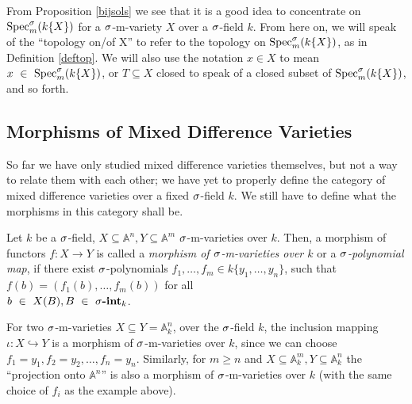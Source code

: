 From Proposition \ref{bijsols} we see that it is a good idea to concentrate on $\operatorname{Spec}^\sigma_m(k\{X\})$ for a $\sigma$-m-variety $X$ over a $\sigma$-field $k$.
 From here on, we will speak of the ``topology on/of X'' to refer to the topology on $\operatorname{Spec}^\sigma_m(k\{X\})$, as in Definition \ref{deftop}. 
We will also use the notation $x \in X$ to mean \\ $x~\in~\operatorname{Spec}^\sigma_m(k\{X\})$, or $T \subseteq X$ closed to speak of a closed subset of $\operatorname{Spec}^\sigma_m(k\{X\})$, and so forth.

\subsection{Morphisms of Mixed Difference Varieties}

So far we have only studied mixed difference varieties themselves, but not a way to relate them with each other; we have yet to properly define the category of mixed difference varieties over a fixed $\sigma$-field $k$. 
We still have to define what the morphisms in this category shall be.

\begin{defn}\label{spolynomialmaps}
Let $k$ be a $\sigma$-field, $X \subseteq \mathbb{A}^n,Y \subseteq \mathbb{A}^m$ $\sigma$-m-varieties over $k$. Then, a morphism of functors $f: X \rightarrow Y$ is called a \emph{morphism of $\sigma$-m-varieties over $k$} or a \emph{$\sigma$-polynomial map},
if there exist $\sigma$-polynomials $f_1,\ldots,f_m \in k\{y_1,\ldots,y_n\}$, such that $f(b) = (f_1(b),\ldots,f_m(b))$ for all \\ $b~\in~X(B), B~\in~\sigma\text{{\normalfont\textbf{-int}}}_k$.  
 
\end{defn}

\begin{ex}
For two $\sigma$-m-varieties $X \subseteq Y = \mathbb{A}^n_k$, over the $\sigma$-field $k$, the inclusion mapping $\iota: X \hookrightarrow Y$ is a morphism of $\sigma$-m-varieties over $k$, since we can choose $f_1 = y_1, f_2 = y_2, \ldots, f_n = y_n$.
Similarly, for $m \geq n$ and $X \subseteq \mathbb{A}^m_k, Y \subseteq \mathbb{A}^n_k$ the ``projection onto $\mathbb{A}^n$'' is also a morphism of $\sigma$-m-varieties over $k$ (with the same choice of $f_i$ as the example above).
\end{ex}

